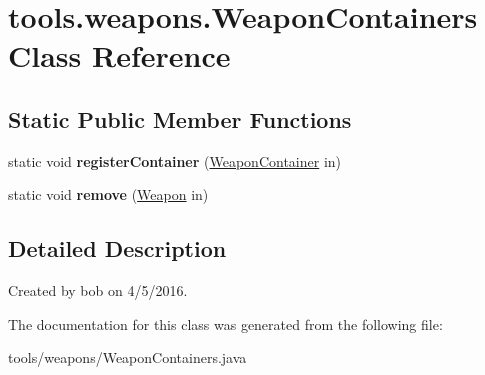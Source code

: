 \hypertarget{classtools_1_1weapons_1_1_weapon_containers}{}\section{tools.\+weapons.\+Weapon\+Containers Class Reference}
\label{classtools_1_1weapons_1_1_weapon_containers}
\subsection*{Static Public Member Functions}
\begin{DoxyCompactItemize}
\item 
static void {\bfseries register\+Container} (\hyperlink{interfacetools_1_1weapons_1_1_weapon_container}{Weapon\+Container} in)\hypertarget{classtools_1_1weapons_1_1_weapon_containers_a8dc639d103a3fcd39e527c6a3c0c7bfb}{}\label{classtools_1_1weapons_1_1_weapon_containers_a8dc639d103a3fcd39e527c6a3c0c7bfb}

\item 
static void {\bfseries remove} (\hyperlink{classtools_1_1weapons_1_1_weapon}{Weapon} in)\hypertarget{classtools_1_1weapons_1_1_weapon_containers_aedb4d5e53b4811a62e106c9e3b7b88e8}{}\label{classtools_1_1weapons_1_1_weapon_containers_aedb4d5e53b4811a62e106c9e3b7b88e8}

\end{DoxyCompactItemize}


\subsection{Detailed Description}
Created by bob on 4/5/2016. 

The documentation for this class was generated from the following file\+:\begin{DoxyCompactItemize}
\item 
tools/weapons/Weapon\+Containers.\+java\end{DoxyCompactItemize}
